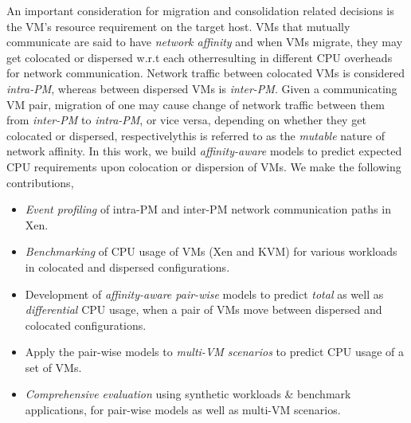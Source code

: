 An important consideration for migration and consolidation related
decisions is the VM's resource requirement on the target host. 
VMs that mutually communicate are said to have \textit{network affinity}
and when VMs migrate, they may get colocated or dispersed w.r.t each 
other\textemdash{}resulting in different CPU overheads for network communication.
Network traffic between colocated VMs is considered \textit{intra-PM}, 
whereas between dispersed VMs is \textit{inter-PM}. Given a 
communicating VM pair, migration of one may cause change of network traffic
between them from \textit{inter-PM} to \textit{intra-PM},
or vice versa, depending on whether they get colocated or dispersed,
respectively\textemdash{}this is referred to as the \textit{mutable} nature 
of network affinity.
In this work, we build
\emph{affinity-aware} models to predict expected CPU
requirements upon colocation or dispersion of VMs.
We make the following
contributions,
\begin{itemize}
		\singlespacing
\vspace{-0.1in}
\item \emph{Event profiling} of intra-PM and inter-PM network 
	communication paths in Xen. %
\item \emph{Benchmarking} of CPU usage
of VMs (Xen and KVM) for various workloads
in colocated and dispersed configurations.
\item Development of \emph{affinity-aware pair-wise} models to predict \textit{total}
	as well as \textit{differential} CPU usage, when a pair of VMs move between
	dispersed and colocated configurations.
\item Apply the pair-wise models to \textit{multi-VM scenarios} to predict CPU usage of a set of VMs.
\item \emph{Comprehensive evaluation} using synthetic workloads \& 
	benchmark applications, for pair-wise models as well as multi-VM scenarios.
\end{itemize}

